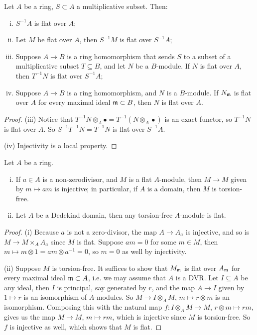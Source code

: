 \documentclass[11pt]{amsart}
\begin{document}
\begin{prop}
    Let $A$ be a ring, $S\subset A$ a multiplicative subset. Then:
    \begin{enumerate}[(i)]
        \item $S^{-1}A$ is flat over $A$;
        \item Let $M$ be flat over $A$, then $S^{-1}M$ is flat over $S^{-1}A$;
        \item Suppose $A\to B$ is a ring homomorphism that sends $S$ to a subset of a multiplicative subset $T\subseteq B$, and let $N$ be a $B$-module. If $N$ is flat over $A$, then $T^{-1}N$ is flat over $S^{-1}A$;
        \item Suppose $A\to B$ is a ring homomorphism, and $N$ is a $B$-module. If $N_{\mathfrak{m}}$ is flat over $A$ for every maximal ideal $\mathfrak{m}\subset B$, then $N$ is flat over $A$.
    \end{enumerate}
\end{prop}

\begin{proof}
    (iii) Notice that $T^{-1}N\otimes_A \bullet = T^{-1}(N\otimes_A \bullet)$ is an exact functor, so $T^{-1}N$ is flat over $A$. So $S^{-1}T^{-1}N = T^{-1}N$ is flat over $S^{-1}A$.

    (iv) Injectivity is a local property.
\end{proof} 


\begin{prop}
    Let $A$ be a ring.
    \begin{enumerate}[(i)]
        \item If $a\in A$ is a non-zerodivisor, and $M$ is a flat $A$-module, then $M\to M$ given by $m\mapsto am$ is injective; in particular, if $A$ is a domain, then $M$ is torsion-free.
        \item Let $A$ be a Dedekind domain, then any torsion-free $A$-module is flat.
    \end{enumerate}
\end{prop}

\begin{proof}
    (i) Because $a$ is not a zero-divisor, the map $A\to A_a$ is injective, and so is $M\to M\times_A A_a$ since $M$ is flat. Suppose $am = 0$ for some $m\in M$, then $m\mapsto m\otimes 1 = am \otimes a^{-1} = 0$, so $m = 0$ as well by injectivity.

    (ii) Suppose $M$ is torsion-free. It suffices to show that $M_{\mathfrak{m}}$ is flat over $A_{\mathfrak{m}}$ for every maximal ideal $\mathfrak{m}\subset A$, i.e. we may assume that $A$ is a DVR. Let $I\subseteq A$ be any ideal, then $I$ is principal, say generated by $r$, and the map $A\to I$ given by $1\mapsto r$ is an isomorphism of $A$-modules. So $M\to I\otimes_A M$, $m\mapsto r\otimes m$ is an isomorphism. Composing this with the natural map $f: I\otimes_A M \to M$, $r\otimes m \mapsto rm$, gives us the map $M\to M$, $m\mapsto rm$, which is injective since $M$ is torsion-free. So $f$ is injective as well, which shows that $M$ is flat.
\end{proof}
\end{document}

